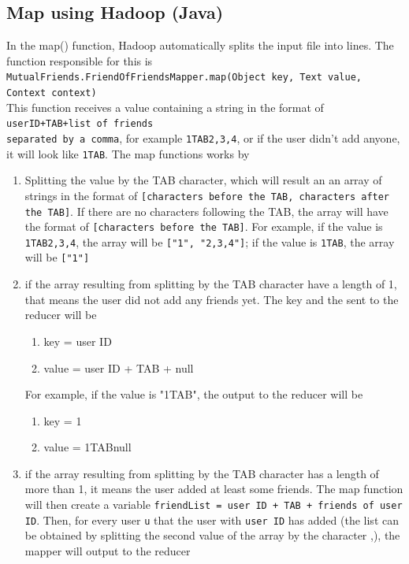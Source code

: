 \documentclass[11pt]{article}
\begin{document}
\begin{justifying}
\subsection{Map using Hadoop (Java)}
In the map() function, Hadoop automatically splits the input file into lines. The function responsible for this is \\ \verb|MutualFriends.FriendOfFriendsMapper.map(Object key, Text value, Context context)|
\\ This function receives a value containing a string in the format of \verb|userID+TAB+list of friends|\\\verb|separated by a comma|, for example \verb|1TAB2,3,4|, or if the user didn't add anyone, it will look like \verb|1TAB|. The map functions works by 
\begin{enumerate}
    \item Splitting the value by the TAB character, which will result an an array of strings in the format of \verb|[characters before the TAB, characters after the TAB]|. If there are no characters following the TAB, the array will have the format of  \verb|[characters before the TAB]|. For example, if the value is \verb|1TAB2,3,4|, the array will be \verb|["1", "2,3,4"]|; if the value is \verb|1TAB|, the array will be \verb|["1"]|
    \item if the array resulting from splitting by the TAB character have a length of 1, that means the user did not add any friends yet. The key and the sent to the reducer will be
    \begin{enumerate}
        \item key \space\space  = user ID
        \item value             = user ID + TAB + null
    \end{enumerate}
    For example, if the value is "1TAB", the output to the reducer will be
    \begin{enumerate}
        \item key \space\space  = 1
        \item value             = 1TABnull
    \end{enumerate}
    \item if the array resulting from splitting by the TAB character has a length of more than 1, it means the user added at least some friends. The map function will then create a variable  \verb|friendList = user ID + TAB + friends of user ID|. Then, for every user \verb|u| that the user with \verb|user ID| has added (the list can be obtained by splitting the second value of the array by the character ,), the mapper will output to the reducer

\end{enumerate}
\end{justifying}
\end{document}
